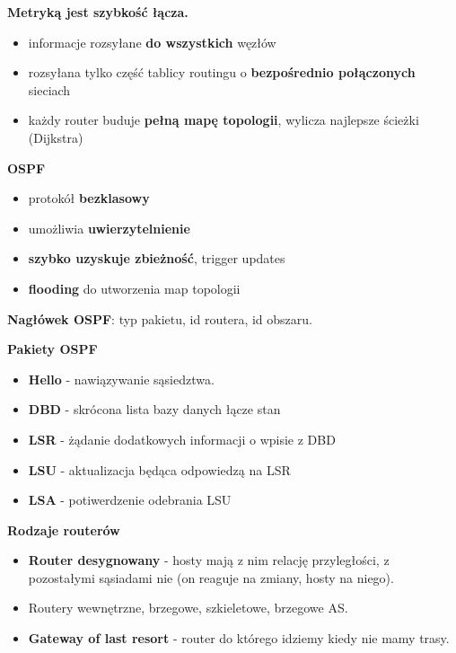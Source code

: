 \documentclass[../main.tex]{subfiles}
\begin{document}
    \textbf{Metryką jest szybkość łącza.}
    \begin{itemize}
        \item informacje rozsyłane \textbf{do wszystkich} węzłów
        \item rozsyłana tylko część tablicy routingu o \textbf{bezpośrednio połączonych} sieciach
        \item każdy router buduje \textbf{pełną mapę topologii}, wylicza najlepsze ścieżki (Dijkstra)
    \end{itemize}

    \textbf{OSPF}
    \begin{itemize}
        \item protokół \textbf{bezklasowy}
        \item umożliwia \textbf{uwierzytelnienie}
        \item \textbf{szybko uzyskuje zbieżność}, trigger updates
        \item \textbf{flooding} do utworzenia map topologii
    \end{itemize}

    \textbf{Nagłówek OSPF}: typ pakietu, id routera, id obszaru.

    \textbf{Pakiety OSPF}
    \begin{itemize}
        \item \textbf{Hello} - nawiązywanie sąsiedztwa.
        \item \textbf{DBD} - skrócona lista bazy danych łącze stan
        \item \textbf{LSR} - żądanie dodatkowych informacji o wpisie z DBD
        \item \textbf{LSU} - aktualizacja będąca odpowiedzą na LSR
        \item \textbf{LSA} - potiwerdzenie odebrania LSU
    \end{itemize}


    \textbf{Rodzaje routerów}
    \begin{itemize}
        \item \textbf{Router desygnowany} - hosty mają z nim relację przyległości, z pozostałymi sąsiadami nie (on reaguje na zmiany, hosty na niego).
        \item Routery wewnętrzne, brzegowe, szkieletowe, brzegowe AS.
        \item \textbf{Gateway of last resort} - router do którego idziemy kiedy nie mamy trasy.
    \end{itemize}
\end{document}
